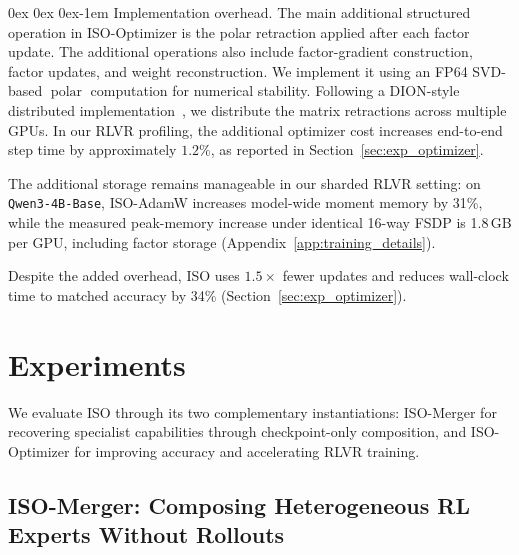 \documentclass[11pt, a4paper]{utda}
\makeatletter
\renewcommand{\paragraph}{%
  \@startsection{paragraph}{4}%
  {\z@}{0ex \@plus 0ex \@minus 0ex}{-1em}%
  {\normalfont\normalsize\bfseries}%
}
\theoremstyle{plain}
\theoremstyle{definition}
\theoremstyle{remark}
\makeatother
\begin{document}
\paragraph{Implementation overhead.}
The main additional structured operation in ISO-Optimizer is the polar
retraction applied after each factor update.
The additional operations
also include factor-gradient construction, factor updates, and weight reconstruction. We implement it using an FP64
SVD-based $\operatorname{polar}$ computation for numerical stability. Following a DION-style distributed
implementation~\cite{ahn2025dion}, we distribute the matrix retractions across multiple GPUs.
In our RLVR profiling, the additional optimizer cost increases end-to-end step
time by approximately $1.2\%$, as reported in
Section~\ref{sec:exp_optimizer}. 

The additional storage remains manageable in our sharded RLVR
setting: on \texttt{Qwen3-4B-Base}, ISO-AdamW increases model-wide
moment memory by 31\%, while the measured peak-memory increase
under identical 16-way FSDP is 1.8\,GB per GPU, including factor
storage (Appendix~\ref{app:training_details}). 

Despite the added overhead, ISO uses $1.5\times$ fewer updates and reduces wall-clock time to matched accuracy by 34\% (Section~\ref{sec:exp_optimizer}).


\section{Experiments}
\label{sec:experiments}
We evaluate ISO through its two complementary instantiations:
ISO-Merger for recovering specialist capabilities through
checkpoint-only composition, and ISO-Optimizer for improving
accuracy and accelerating RLVR training.

\subsection{ISO-Merger: Composing Heterogeneous RL Experts Without Rollouts}

\end{document}
